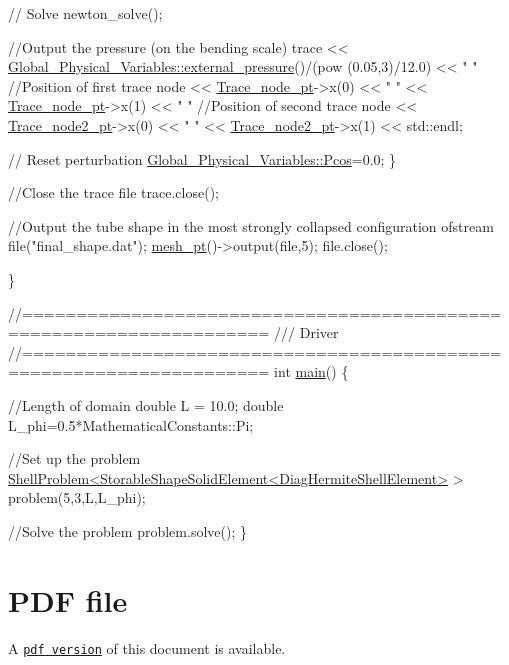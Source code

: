 \begin{DoxyCodeInclude}
   \textcolor{comment}{// Solve}
   newton\_solve();
   

   \textcolor{comment}{//Output the pressure (on the bending scale)}
   trace << \hyperlink{namespaceGlobal__Physical__Variables_a80149b39ce76ea0a779f7493905eb1b8}{Global\_Physical\_Variables::external\_pressure}()/(pow
      (0.05,3)/12.0) 
         << \textcolor{stringliteral}{" "}
         \textcolor{comment}{//Position of first trace node}
         << \hyperlink{classShellProblem_a45230216c4791c683218ff6d7f4ba9a0}{Trace\_node\_pt}->x(0) << \textcolor{stringliteral}{" "} << \hyperlink{classShellProblem_a45230216c4791c683218ff6d7f4ba9a0}{Trace\_node\_pt}->x(1) << \textcolor{stringliteral}{" "} 
          \textcolor{comment}{//Position of second trace node}
         << \hyperlink{classShellProblem_a1933abc1b3e5637e23fa2809eb1cd88f}{Trace\_node2\_pt}->x(0) << \textcolor{stringliteral}{" "} << \hyperlink{classShellProblem_a1933abc1b3e5637e23fa2809eb1cd88f}{Trace\_node2\_pt}->x(1) << std::endl;

   \textcolor{comment}{// Reset perturbation}
   \hyperlink{namespaceGlobal__Physical__Variables_ab55734aaa66260cd9d4bf68a4ecafdd5}{Global\_Physical\_Variables::Pcos}=0.0;
  \}

 \textcolor{comment}{//Close the trace file}
 trace.close();
 
 \textcolor{comment}{//Output the tube shape in the most strongly collapsed configuration}
 ofstream file(\textcolor{stringliteral}{"final\_shape.dat"});
 \hyperlink{classShellProblem_a1905a1b913469ed54f7c8f55d133ff57}{mesh\_pt}()->output(file,5);
 file.close();


\}


\textcolor{comment}{//====================================================================}\textcolor{comment}{}
\textcolor{comment}{/// Driver}
\textcolor{comment}{}\textcolor{comment}{//====================================================================}
\textcolor{keywordtype}{int} \hyperlink{clamped__shell_8cc_ae66f6b31b5ad750f1fe042a706a4e3d4}{main}()
\{

 \textcolor{comment}{//Length of domain}
 \textcolor{keywordtype}{double} L = 10.0;
 \textcolor{keywordtype}{double} L\_phi=0.5*MathematicalConstants::Pi;

 \textcolor{comment}{//Set up the problem}
 \hyperlink{classShellProblem}{ShellProblem<StorableShapeSolidElement<DiagHermiteShellElement>}
       > 
  problem(5,3,L,L\_phi);

 \textcolor{comment}{//Solve the problem}
 problem.solve();
\}






\end{DoxyCodeInclude}




 

 \hypertarget{index_pdf}{}\section{P\+D\+F file}\label{index_pdf}
A \href{../latex/refman.pdf}{\tt pdf version} of this document is available. 
